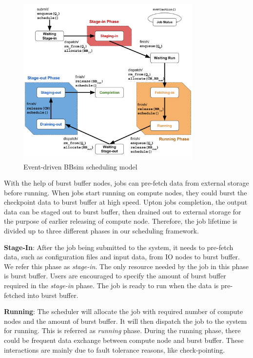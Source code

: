\begin{figure}[!htbp]
\centering
        \includegraphics[width=3.6in]{3PhaseJobFSM}
        \caption{Event-driven BBsim scheduling model}
\label{Fig:JobFSM}
\end{figure}

With the help of burst buffer nodes,
jobs can pre-fetch data from external storage before running.
When jobs start running on compute nodes,
they could burst the checkpoint data to burst buffer at high speed.
Upton jobs completion, the output data can be staged out to burst buffer,
then drained out to external storage for the purpose of earlier releasing of compute node.
Therefore,
the job lifetime is divided up to three different phases in our scheduling framework.

\textbf{Stage-In}: After the job being submitted to the system,
         it needs to pre-fetch data, such as configuration files and input data,
         from IO nodes to burst buffer. We refer this phase as \textit{stage-in}.
         The only resource needed by the job in this phase is burst buffer.
         Users are encouraged to specify the amount of burst buffer required in the \textit{stage-in} phase.
         The job is ready to run when the data is pre-fetched into burst buffer.
 
\textbf{Running}: The scheduler will allocate the job with required
         number of compute nodes and the amount of burst buffer. 
         It will then dispatch the job to the system for running.
         This is referred as \textit{running} phase.
         During the running phase, there could be frequent data exchange
         between compute node and burst buffer.
         These interactions are mainly due to fault tolerance reasons, like check-pointing. 
 
